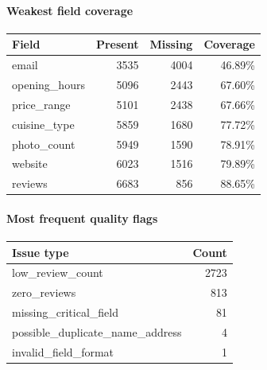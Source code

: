 \paragraph{Weakest field coverage}
\begin{tabular}{lrrr}
\toprule
Field & Present & Missing & Coverage \\
\midrule
email & 3535 & 4004 & 46.89\% \\
opening\_hours & 5096 & 2443 & 67.60\% \\
price\_range & 5101 & 2438 & 67.66\% \\
cuisine\_type & 5859 & 1680 & 77.72\% \\
photo\_count & 5949 & 1590 & 78.91\% \\
website & 6023 & 1516 & 79.89\% \\
reviews & 6683 & 856 & 88.65\% \\
\bottomrule
\end{tabular}

\paragraph{Most frequent quality flags}
\begin{tabular}{lr}
\toprule
Issue type & Count \\
\midrule
low\_review\_count & 2723 \\
zero\_reviews & 813 \\
missing\_critical\_field & 81 \\
possible\_duplicate\_name\_address & 4 \\
invalid\_field\_format & 1 \\
\bottomrule
\end{tabular}

